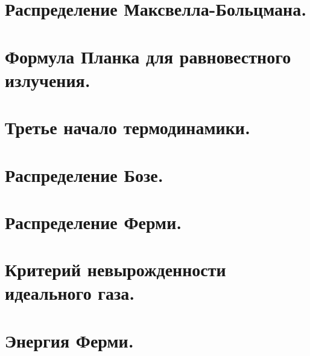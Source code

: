 \begin{multicols*}{2}
		\section{Распределение Максвелла-Больцмана.}
		
		\section{Формула Планка для равновестного излучения.}
		
		\section{Третье начало термодинамики.}
		
		\section{Распределение Бозе.}
		
		\section{Распределение Ферми.}
		
		\section{Критерий невырожденности идеального газа.}
		
		\section{Энергия Ферми.}
		
	\end{multicols*}

